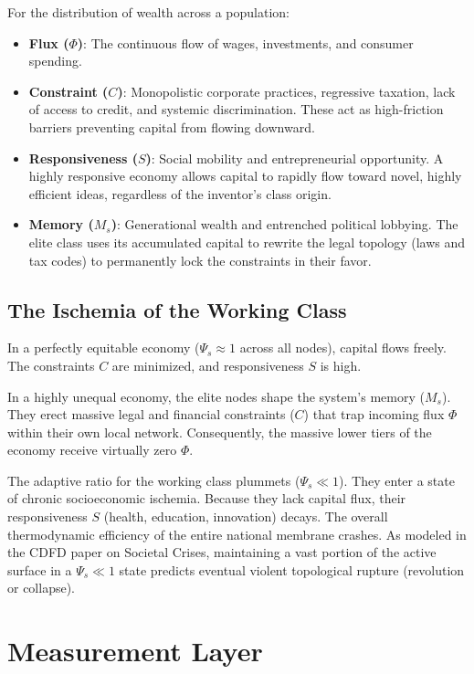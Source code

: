 \documentclass[11pt,a4paper]{article}
\begin{document}
For the distribution of wealth across a population:
\begin{itemize}
    \item \textbf{Flux ($\Phi$)}: The continuous flow of wages, investments, and consumer spending.
    \item \textbf{Constraint ($C$)}: Monopolistic corporate practices, regressive taxation, lack of access to credit, and systemic discrimination. These act as high-friction barriers preventing capital from flowing downward.
    \item \textbf{Responsiveness ($S$)}: Social mobility and entrepreneurial opportunity. A highly responsive economy allows capital to rapidly flow toward novel, highly efficient ideas, regardless of the inventor's class origin.
    \item \textbf{Memory ($M_s$)}: Generational wealth and entrenched political lobbying. The elite class uses its accumulated capital to rewrite the legal topology (laws and tax codes) to permanently lock the constraints in their favor.
\end{itemize}

\subsection{The Ischemia of the Working Class}
In a perfectly equitable economy ($\Psi_s \approx 1$ across all nodes), capital flows freely. The constraints $C$ are minimized, and responsiveness $S$ is high.

In a highly unequal economy, the elite nodes shape the system's memory ($M_s$). They erect massive legal and financial constraints ($C$) that trap incoming flux $\Phi$ within their own local network. Consequently, the massive lower tiers of the economy receive virtually zero $\Phi$.

The adaptive ratio for the working class plummets ($\Psi_s \ll 1$). They enter a state of chronic socioeconomic ischemia. Because they lack capital flux, their responsiveness $S$ (health, education, innovation) decays. The overall thermodynamic efficiency of the entire national membrane crashes. As modeled in the CDFD paper on Societal Crises, maintaining a vast portion of the active surface in a $\Psi_s \ll 1$ state predicts eventual violent topological rupture (revolution or collapse).



\section{Measurement Layer}
\end{document}
